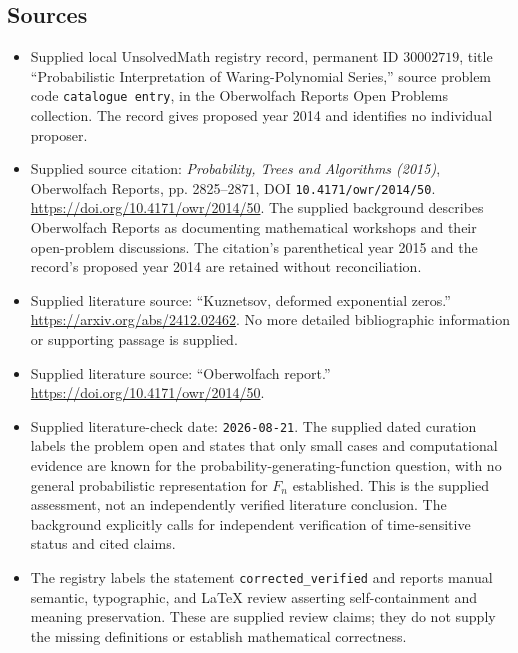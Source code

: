 \documentclass[11pt]{article}
\begin{document}
\subsection{Sources}
\begin{itemize}
\item Supplied local UnsolvedMath registry record, permanent ID \(30002719\), title ``Probabilistic Interpretation of Waring-Polynomial Series,'' source problem code \texttt{catalogue entry}, in the Oberwolfach Reports Open Problems collection. The record gives proposed year 2014 and identifies no individual proposer.
\item Supplied source citation: \emph{Probability, Trees and Algorithms (2015)}, Oberwolfach Reports, pp. 2825--2871, DOI \texttt{10.4171/owr/2014/50}. \url{https://doi.org/10.4171/owr/2014/50}. The supplied background describes Oberwolfach Reports as documenting mathematical workshops and their open-problem discussions. The citation's parenthetical year 2015 and the record's proposed year 2014 are retained without reconciliation.
\item Supplied literature source: ``Kuznetsov, deformed exponential zeros.'' \url{https://arxiv.org/abs/2412.02462}. No more detailed bibliographic information or supporting passage is supplied.
\item Supplied literature source: ``Oberwolfach report.'' \url{https://doi.org/10.4171/owr/2014/50}.
\item Supplied literature-check date: \texttt{2026-08-21}. The supplied dated curation labels the problem open and states that only small cases and computational evidence are known for the probability-generating-function question, with no general probabilistic representation for \(F_n\) established. This is the supplied assessment, not an independently verified literature conclusion. The background explicitly calls for independent verification of time-sensitive status and cited claims.
\item The registry labels the statement \texttt{corrected\_verified} and reports manual semantic, typographic, and LaTeX review asserting self-containment and meaning preservation. These are supplied review claims; they do not supply the missing definitions or establish mathematical correctness.
\end{itemize}
\end{document}
